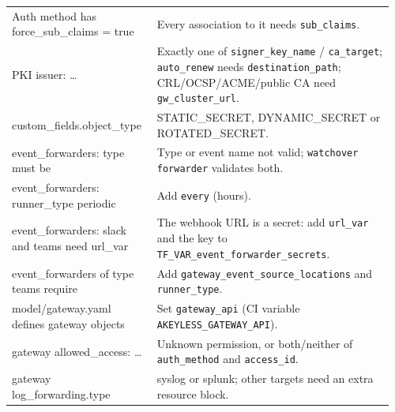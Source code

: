 {\begin{longtable}{@{}>{\raggedright\arraybackslash}p{0.36\linewidth}>{\raggedright\arraybackslash}p{0.6\linewidth}@{}}
Auth method has force\_sub\_claims = true & Every association to it needs \texttt{sub\_claims}. \\
PKI issuer: \ldots & Exactly one of \texttt{signer\_key\_name} / \texttt{ca\_target}; \texttt{auto\_renew} needs \texttt{destination\_path}; CRL/OCSP/ACME/public CA need \texttt{gw\_cluster\_url}. \\
custom\_fields.object\_type & STATIC\_SECRET, DYNAMIC\_SECRET or ROTATED\_SECRET. \\
event\_forwarders: type must be & Type or event name not valid; \texttt{watchover forwarder} validates both. \\
event\_forwarders: runner\_type periodic & Add \texttt{every} (hours). \\
event\_forwarders: slack and teams need url\_var & The webhook URL is a secret: add \texttt{url\_var} and the key to \texttt{TF\_VAR\_event\_forwarder\_secrets}. \\
event\_forwarders of type teams require & Add \texttt{gateway\_event\_source\_locations} and \texttt{runner\_type}. \\
model/gateway.yaml defines gateway objects & Set \texttt{gateway\_api} (CI variable \texttt{AKEYLESS\_GATEWAY\_API}). \\
gateway allowed\_access: \ldots & Unknown permission, or both/neither of \texttt{auth\_method} and \texttt{access\_id}. \\
gateway log\_forwarding.type & syslog or splunk; other targets need an extra resource block. \\
\bottomrule
\end{longtable}}

